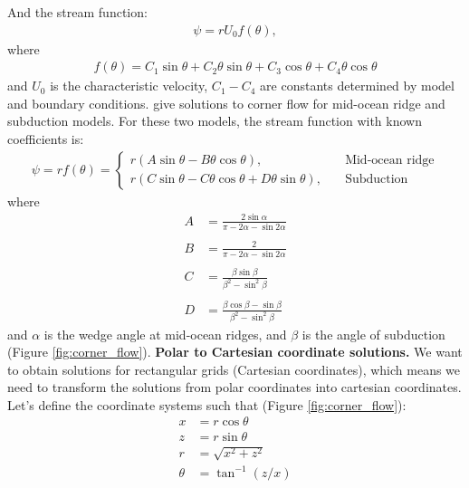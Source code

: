 \documentclass[a4paper,11pt]{article}
\begin{document}
And the stream function:
\begin{align}
\psi = r U_0 f(\theta),
\end{align}
where
\begin{align}
f(\theta) = C_1\sin\theta+C_2\theta\sin\theta+C_3\cos\theta+C_4\theta\cos\theta
\end{align}
and $U_0$ is the characteristic velocity, $C_1-C_4$ are constants determined by model and boundary conditions. \citet{Spiegelman1987} give solutions to corner flow for mid-ocean ridge and subduction models. For these two models, the stream function with known coefficients is:
\begin{align}
\psi = r f(\theta) = 
 \begin{cases}
r(A\sin\theta-B\theta\cos\theta), & \quad \text{Mid-ocean ridge}\\
r(C\sin\theta-C\theta\cos\theta+D\theta\sin\theta), & \quad \text{Subduction}
  \end{cases}
\end{align}
where 
\begin{align}
A&=\frac{\displaystyle 2\sin\alpha}{\displaystyle \pi-2\alpha-\sin2\alpha} \\
&\nonumber  \\
B&=\frac{\displaystyle 2}{\displaystyle \pi-2\alpha-\sin2\alpha} \\
&\nonumber  \\
C&=\frac{\displaystyle \beta\sin\beta}{\displaystyle \beta^2-\sin^2\beta} \\
&\nonumber  \\
D&=\frac{\displaystyle \beta\cos\beta-\sin\beta}{\displaystyle \beta^2-\sin^2\beta}
\end{align}
and $\alpha$ is the wedge angle at mid-ocean ridges, and $\beta$ is the angle of subduction (Figure \ref{fig:corner_flow}).
\newline\newline
\textbf{Polar to Cartesian coordinate solutions.} We want to obtain solutions for rectangular grids (Cartesian coordinates), which means we need to transform the solutions from polar coordinates into cartesian coordinates. Let's define the coordinate systems such that (Figure \ref{fig:corner_flow}):
\begin{align}
x &= r\cos\theta \\
z &= r\sin\theta \\
r &= \sqrt{x^2+z^2}\\
\theta &= \tan^{-1}({z/x})
\end{align}
\end{document}
